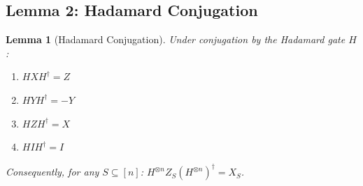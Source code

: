 \documentclass[11pt,a4paper]{article}
\theoremstyle{definition}
\theoremstyle{plain}
\newtheorem{lemma}[theorem]{Lemma}
\begin{document}
\subsection{Lemma 2: Hadamard Conjugation}

\begin{lemma}[Hadamard Conjugation] \label{lem:hadamard}
Under conjugation by the Hadamard gate $H$:
\begin{enumerate}
\item $H X H^\dagger = Z$
\item $H Y H^\dagger = -Y$
\item $H Z H^\dagger = X$
\item $H I H^\dagger = I$
\end{enumerate}
Consequently, for any $S \subseteq [n]$: $H^{\otimes n} Z_S (H^{\otimes n})^\dagger = X_S$.
\end{lemma}
\end{document}

